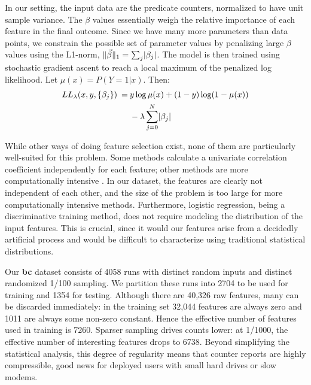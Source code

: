 In our setting, the input data are the predicate counters, normalized
to have unit sample variance.  The $\beta$ values essentially weigh
the relative importance of each feature in the final outcome.  Since
we have many more parameters than data points, we constrain the
possible set of parameter values by penalizing large $\beta$ values
using the L1-norm, $\lVert\vec\beta\rVert_1 = \sum_j \lvert\beta_j\rvert$.  The
model is then trained using stochastic gradient ascent to reach a
local maximum of the penalized log likelihood.  Let $\mu(x) = P(Y = 1
| x)$.  Then:
\begin{equation*}
  \begin{split}
    LL_\lambda (x, y, \{\beta_j\}) \:=\:
    & y \log \mu(x) + (1 - y) \log (1 - \mu(x)) \\
    & - \lambda \sum_{j = 0}^N \lvert\beta_j\rvert
  \end{split}
\end{equation*}

While other ways of doing feature selection exist, none of them are
particularly well-suited for this problem.  Some methods
\cite{Golub:MCC:1999,Tibshirani2002} calculate a univariate
correlation coefficient independently for each feature; other methods
are more computationally intensive \cite{Breiman:RFRF:1999,Hastie01}.
In our dataset, the features are clearly not independent of each
other, and the size of the problem is too large for more
computationally intensive methods.  Furthermore, logistic regression,
being a discriminative training method, does not require modeling the
distribution of the input features.  This is crucial, since it would
our features arise from a decidedly artificial process and would be
difficult to characterize using traditional statistical distributions.

Our \textbf{bc} dataset consists of 4058 runs with distinct random
inputs and distinct randomized 1/100 sampling.  We partition these
runs into 2704 to be used for training and 1354 for testing.  Although
there are 40,326 raw features, many can be discarded immediately: in
the training set 32,044 features are always zero and 1011 are always
some non-zero constant.  Hence the effective number of features used
in training is 7260.  Sparser sampling drives counts lower: at 1/1000,
the effective number of interesting features drops to 6738.  Beyond
simplifying the statistical analysis, this degree of regularity means
that counter reports are highly compressible, good news for deployed
users with small hard drives or slow modems.

